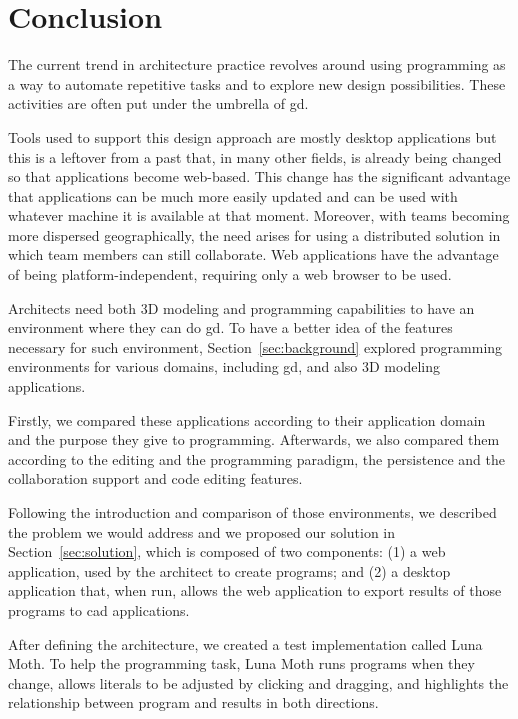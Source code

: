 
\section{Conclusion}
\label{sec:conclusion}


The current trend in architecture practice revolves around using programming as a way to automate repetitive tasks and to explore new design possibilities.
These activities are often put under the umbrella of \acrfull{gd}.

Tools used to support this design approach are mostly desktop applications but this is a leftover from a past that, in many other fields, is already being changed so that applications become web-based.
This change has the significant advantage that applications can be much more easily updated and can be used with whatever machine it is available at that moment.
Moreover, with teams becoming more dispersed geographically, the need arises for using a distributed solution in which team members can still collaborate.
Web applications have the advantage of being platform-independent, requiring only a web browser to be used.

Architects need both 3D modeling and programming capabilities to have an environment where they can do \gls{gd}.
To have a better idea of the features necessary for such environment, Section~\ref{sec:background} explored programming environments for various domains, including \gls{gd}, and also 3D modeling applications.

Firstly, we compared these applications according to their application domain and the purpose they give to programming.
Afterwards, we also compared them according to the editing and the programming paradigm, the persistence and the collaboration support and code editing features.

Following the introduction and comparison of those environments, we described the problem we would address and we proposed our solution in Section~\ref{sec:solution}, which is composed of two components:
(1) a web application, used by the architect to create programs;
and (2) a desktop application that, when run, allows the web application to export results of those programs to \gls{cad} applications.

After defining the architecture, we created a test implementation called Luna Moth.
To help the programming task, Luna Moth runs programs when they change, allows literals to be adjusted by clicking and dragging, and highlights the relationship between program and results in both directions.

